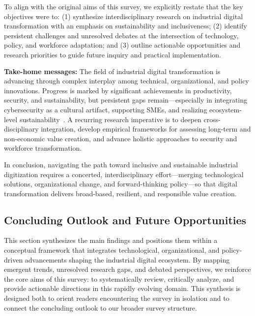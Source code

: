 \documentclass[sigconf]{acmart}
\begin{document}
To align with the original aims of this survey, we explicitly restate that the key objectives were to: (1) synthesize interdisciplinary research on industrial digital transformation with an emphasis on sustainability and inclusiveness; (2) identify persistent challenges and unresolved debates at the intersection of technology, policy, and workforce adaptation; and (3) outline actionable opportunities and research priorities to guide future inquiry and practical implementation.

\textbf{Take-home messages:} The field of industrial digital transformation is advancing through complex interplay among technical, organizational, and policy innovations. Progress is marked by significant achievements in productivity, security, and sustainability, but persistent gaps remain—especially in integrating cybersecurity as a cultural artifact, supporting SMEs, and realizing ecosystem-level sustainability~\cite{ref25}\cite{ref35}. A recurring research imperative is to deepen cross-disciplinary integration, develop empirical frameworks for assessing long-term and non-economic value creation, and advance holistic approaches to security and workforce transformation.

In conclusion, navigating the path toward inclusive and sustainable industrial digitization requires a concerted, interdisciplinary effort—merging technological solutions, organizational change, and forward-thinking policy—so that digital transformation delivers broad-based, resilient, and responsible value creation.

\subsection{Concluding Outlook and Future Opportunities}

This section synthesizes the main findings and positions them within a conceptual framework that integrates technological, organizational, and policy-driven advancements shaping the industrial digital ecosystem. By mapping emergent trends, unresolved research gaps, and debated perspectives, we reinforce the core aims of this survey: to systematically review, critically analyze, and provide actionable directions in this rapidly evolving domain. This synthesis is designed both to orient readers encountering the survey in isolation and to connect the concluding outlook to our broader survey structure.
\end{document}
